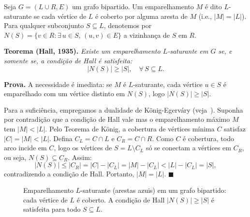 \documentclass[12pt,a4paper]{article}
\begin{document}
Seja $G = (L \cup R, E)$ um grafo bipartido. Um emparelhamento $M$ é dito $L$-saturante se cada vértice de $L$ é coberto por alguma aresta de $M$ (i.e., $|M| = |L|$). Para qualquer subconjunto $S \subseteq L$, denotemos por $N(S) = \{v \in R : \exists\, u \in S, \, (u,v) \in E\}$ a vizinhança de $S$ em $R$.

\textbf{Teorema (Hall, 1935).} \textit{Existe um emparelhamento $L$-saturante em $G$ se, e somente se, a condição de Hall é satisfeita:}
\begin{equation}
    |N(S)| \ge |S|, \quad \forall\, S \subseteq L.
\end{equation}

\textbf{Prova.}
A necessidade é imediata: se $M$ é $L$-saturante, cada vértice $u \in S$ é emparelhado com um vértice distinto em $N(S)$, logo $|N(S)| \ge |S|$.

Para a suficiência, empregamos a dualidade de König-Egerváry (veja~\cite{korte2018combinatorial}). Suponha por contradição que a condição de Hall vale mas o emparelhamento máximo $M$ tem $|M| < |L|$. Pelo Teorema de König, a cobertura de vértices mínima $C$ satisfaz $|C| = |M| < |L|$. Defina $C_L = C \cap L$ e $C_R = C \cap R$. Como $C$ é cobertura, todo arco incide em $C$, logo os vértices de $S = L \setminus C_L$ só se conectam a vértices em $C_R$, ou seja, $N(S) \subseteq C_R$. Assim:
$$|N(S)| \le |C_R| = |C| - |C_L| = |M| - |C_L| < |L| - |C_L| = |S|,$$
contradizendo a condição de Hall. Portanto, $|M| = |L|$. $\blacksquare$

\begin{figure}[h]
\centering
{}
\caption{Emparelhamento $L$-saturante (arestas azuis) em um grafo bipartido: cada vértice de $L$ é coberto. A condição de Hall $|N(S)| \ge |S|$ é satisfeita para todo $S \subseteq L$.}
\label{fig:hall_matching}
\end{figure}
\end{document}
